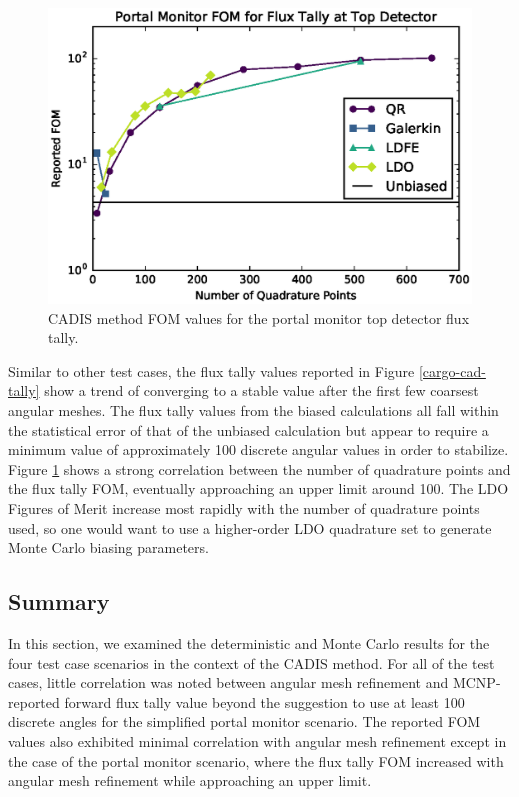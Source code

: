 \begin{figure}[!htb]
\centering
\includegraphics[max height=0.445\textheight]{img/cargo-plots/mcnp/cadis-fom-14.eps}
\caption{CADIS method FOM values for the portal monitor top detector flux tally.}
\label{cargo-cad-fom}
\end{figure}

Similar to other test cases, the flux tally values reported in Figure 
\ref{cargo-cad-tally} show a trend of converging to a stable value after the first few
coarsest angular meshes. The flux tally values from the biased calculations all fall
within the statistical error of that of the unbiased calculation but appear to require
a minimum value of approximately 100 discrete angular values in order to stabilize.
Figure \ref{cargo-cad-fom} shows a strong correlation between the number of quadrature
points and the flux tally FOM, eventually approaching an upper limit around 100.
The LDO Figures of Merit increase most rapidly with the
number of quadrature points used, so one would want to use a higher-order LDO 
quadrature set to generate Monte Carlo biasing parameters.

\FloatBarrier
\subsection{Summary}

In this section, we examined the deterministic and Monte Carlo results for the four
test case scenarios in the context of the CADIS method. 
For all of the test cases, little correlation was noted between angular mesh
refinement and MCNP-reported forward flux tally value beyond the suggestion to use
at least 100 discrete angles for the simplified portal monitor scenario. The reported
FOM values also exhibited minimal correlation with angular mesh refinement except in
the case of the portal monitor scenario, where the flux tally FOM increased with angular mesh
refinement while approaching an upper limit.

